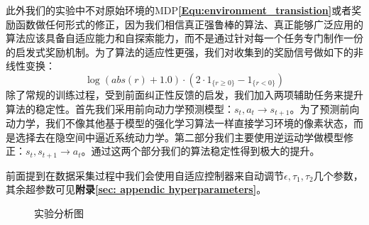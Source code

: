 此外我们的实验中不对原始环境的MDP\textbf{\eqref{Equ:environment_transistion}}或者奖励函数做任何形式的修正，因为我们相信真正强鲁棒的算法、真正能够广泛应用的算法应该具备自适应能力和自探索能力，而不是通过针对每一个任务专门制作一份的启发式奖励机制。为了算法的适应性更强，我们对收集到的奖励信号做如下的非线性变换：
\begin{equation}
    \log (a b s(r)+1.0) \cdot\left(2 \cdot 1_{\{r \geq 0\}}-1_{\{r<0\}}\right)
\end{equation}
除了常规的训练过程，受到前面纠正性反馈的启发，我们加入两项辅助任务来提升算法的稳定性。首先我们采用前向动力学预测模型：$s_{t}, a_{t} \rightarrow s_{t+1}$。为了预测前向动力学，我们不像其他基于模型的强化学习算法一样直接学习环境的像素状态，而是选择去在隐空间中逼近系统动力学。第二部分我们主要使用逆运动学做模型修正：$s_{t}, s_{t+1} \rightarrow a_{t}$。通过这两个部分我们的算法稳定性得到极大的提升。

前面提到在数据采集过程中我们会使用自适应控制器来自动调节$\epsilon,\tau_1,\tau_2$几个参数，其余超参数可见\textbf{附录\ref{sec: appendic hyperparameters}}。


\begin{figure}[!t]
    \subfigure[surround]{
    
    \label{Fig: atari_score_surround}
    }
    
        \subfigure[alien]{
    
    \label{Fig: atari_score_alien}
    }
    
    \subfigure[atlantis]{
    
    \label{Fig: atari_score_atlantis}
    }
    \subfigure[gopher]{
    
    \label{Fig: atari_score_gopher}
    }
    \subfigure[jamesbond]{
    
    \label{Fig: atari_score_jamesbond}
    }

\caption{实验分析图}
\end{figure}

